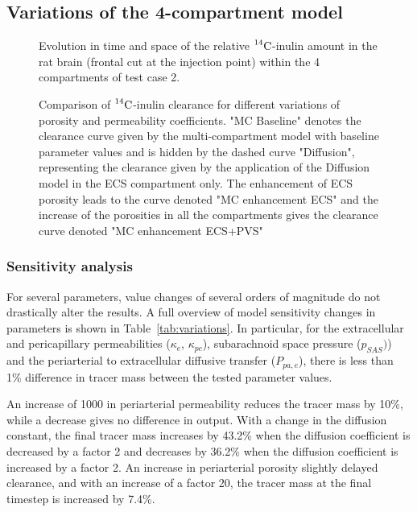 \documentclass[a4paper,11pt]{article}
\newcommand{\1}{^{(1)}}
\newcommand{\2}{^{(2)}}
\newcommand{\Cinulin}{$\prescript{14}{}{\text{C}}$-inulin }
\begin{document}
\subsection{Variations of the 4-compartment model}


\begin{figure}[htb]
    \centering
    \caption{Evolution in time and space of the relative \Cinulin amount in the rat brain (frontal cut at the injection point) within the 4 compartments of test case 2. }
    \label{fig:cut-concentrations}
\end{figure}


\begin{figure}[htbp]
         \centering
        \caption{Comparison of \Cinulin clearance for different variations of porosity and permeability coefficients. "MC Baseline" denotes the clearance curve given by the multi-compartment model with baseline parameter values and is hidden by the dashed curve "Diffusion", representing the clearance given by the application of the Diffusion model in the ECS compartment only. The enhancement of ECS porosity leads to the curve denoted "MC enhancement ECS" and  the increase of the porosities in all the compartments gives the clearance curve denoted "MC enhancement ECS+PVS"}
        \label{fig:compare-poro}
\end{figure}



\subsubsection{Sensitivity analysis}
For several parameters, value changes of several orders of magnitude do not drastically alter the results. A full overview of model sensitivity changes in parameters is shown in Table~\ref{tab:variations}. In particular, for the extracellular and pericapillary permeabilities ($\kappa_e$, $\kappa_{pc}$), subarachnoid space pressure ($p_{SAS})$) and the periarterial to extracellular diffusive transfer ($P_{pa,e}$), there is less than 1\% difference in tracer mass between the tested parameter values. 

An increase of 1000 in periarterial permeability reduces the tracer mass by 10\%, while a decrease gives no difference in output. With a change in the diffusion constant, the final tracer mass increases by 43.2\% when the diffusion coefficient is decreased by a factor 2 and decreases by 36.2\% when the diffusion coefficient is increased by a factor 2. An increase in periarterial porosity slightly delayed clearance, and with an increase of a factor 20, the tracer mass at the final timestep is increased by 7.4\%. 
\end{document}
